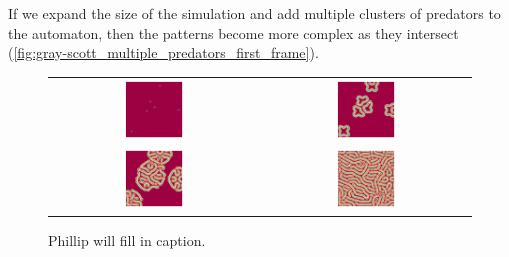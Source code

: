 If we expand the size of the simulation and add multiple clusters of predators to the automaton, then the patterns become more complex as they intersect (\autoref{fig:gray-scott_multiple_predators_first_frame}).\\

\begin{figure}[h]
\centering
\mySfFamily
\begin{tabular}{c c}
\includegraphics[width = 0.3\textwidth]{../images/f038_100_multi_Moment_1.jpg} & \includegraphics[width = 0.3\textwidth]{../images/f038_100_multi_Moment_2.jpg} \\[2ex]
\includegraphics[width = 0.3\textwidth]{../images/f038_100_multi_Moment_3.jpg} & \includegraphics[width = 0.3\textwidth]{../images/f038_100_multi_Moment_4.jpg}
\end{tabular}
\caption{Phillip will fill in caption.}
\label{fig:gray-scott_multiple_predators_first_frame}
\end{figure}

